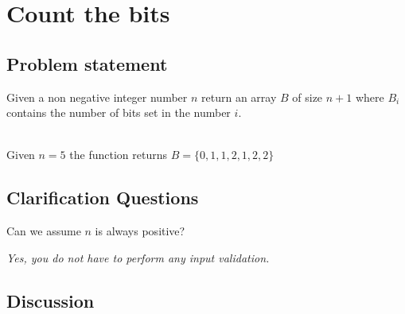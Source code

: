 %



\chapter{Count the bits}
\label{ch:count_bits}

\section{Problem statement}
\begin{exercise}
\label{example:count_bits:exercice1}
Given a non negative integer number $n$ return an array $B$ of size $n+1$ where $B_i$ contains the
number of bits set in the number $i$.
	\begin{example}
		\label{example:count_bits:example1}
		\hfill \\
		Given $n = 5$ the function returns $B = \{0,1,1,2,1,2,2\}$	
	\end{example}

\end{exercise}

\section{Clarification Questions}

\begin{QandA}
	\item \begin{questionitem} \begin{question} Can we assume $n$ is always positive?  \end{question} 	 
    \begin{answered}
		\textit{Yes, you do not have to perform any input validation.}
	\end{answered} \end{questionitem}
	
\end{QandA}

\section{Discussion}
\label{count_bits:sec:discussion}


